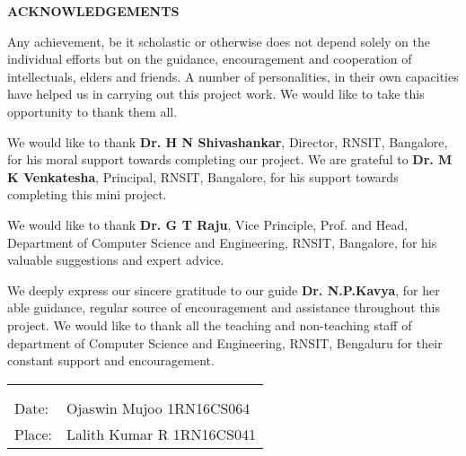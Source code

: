 \thispagestyle{empty}
\begin{center}
\textup{\large{\textbf{ACKNOWLEDGEMENTS}}} \\[0.1in]
\end{center}

\justify
\indent
Any achievement, be it scholastic or otherwise does not depend solely on the individual efforts but on the guidance, encouragement and cooperation of intellectuals, elders and friends. A number of personalities, in their own capacities have helped us in carrying out this project work. We would like to take this opportunity to thank them all.

We would like to thank \textbf{Dr. H N Shivashankar}, Director, RNSIT, Bangalore, for his moral support towards completing our project. We are grateful to \textbf{Dr. M K Venkatesha}, Principal, RNSIT, Bangalore, for his support towards completing this mini project.

We would like to thank \textbf{Dr. G T Raju}, Vice Principle, Prof. and Head, Department of
Computer Science and Engineering, RNSIT, Bangalore, for his valuable suggestions and expert advice.

We deeply express our sincere gratitude to our guide \textbf{Dr. N.P.Kavya}, for her able guidance, regular source of encouragement and assistance throughout this project.
We would like to thank all the teaching and non-teaching staff of department of Computer Science and Engineering, RNSIT, Bengaluru for their constant support and encouragement.

\vfill

\justify
\begin{tabularx}{\linewidth}{X X}
 & {\hfill}\textup{ }\\ 
  & {\hfill}\textup{ }\\ 
 \textup{Date:} & {\hfill}\textup{Ojaswin Mujoo 1RN16CS064}\\
\textup{Place:} & {\hfill}\textup{Lalith Kumar R 1RN16CS041}\\
\end{tabularx}


\pagebreak